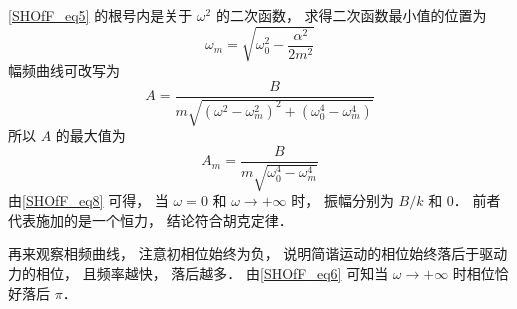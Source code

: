 \autoref{SHOfF_eq5} 的根号内是关于 $\omega^2$ 的二次函数， 求得二次函数最小值的位置为
\begin{equation}
\omega_m = \sqrt{\omega_0^2 - \frac{\alpha^2}{2m^2}}
\end{equation}
幅频曲线可改写为
\begin{equation}\label{SHOfF_eq8}
A = \frac{B}{m\sqrt{(\omega^2 - \omega_m^2)^2 + (\omega_0^4 - \omega_m^4)}}
\end{equation}
所以 $A$ 的最大值为
\begin{equation}
A_m = \frac{B}{m\sqrt{\omega_0^4 - \omega_m^4}}
\end{equation}
由\autoref{SHOfF_eq8} 可得， 当 $\omega = 0$ 和 $\omega\to +\infty$ 时， 振幅分别为 $B/k$ 和 $0$． 前者代表施加的是一个恒力， 结论符合胡克定律．

再来观察相频曲线， 注意初相位始终为负， 说明简谐运动的相位始终落后于驱动力的相位， 且频率越快， 落后越多． 由\autoref{SHOfF_eq6} 可知当 $\omega\to +\infty$ 时相位恰好落后 $\pi$．



